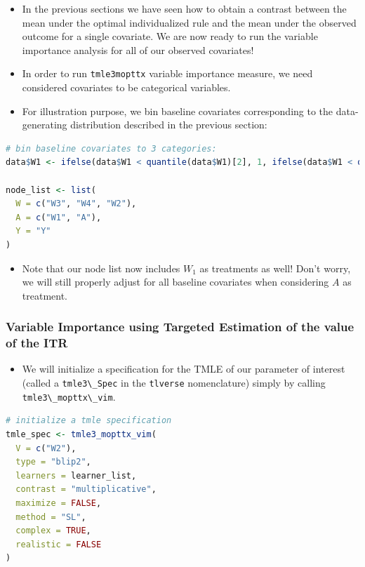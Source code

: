 \documentclass[
  12pt, krantz2,
]{book}
\newcommand{\passthrough}[1]{#1}
\providecommand{\tightlist}{%
  \setlength{\itemsep}{0pt}\setlength{\parskip}{0pt}}
\theoremstyle{definition}
\theoremstyle{definition}
\theoremstyle{definition}
\newcommand{\1}{\mathbbm{1}}
\begin{document}
\begin{itemize}
\item
  In the previous sections we have seen how to obtain a contrast between the
  mean under the optimal individualized rule and the mean under the observed outcome for a
  single covariate. We are now ready to run the variable importance analysis for all of our
  observed covariates!
\item
  In order to run \passthrough{\lstinline!tmle3mopttx!} variable importance measure, we
  need considered covariates to be categorical variables.
\item
  For illustration purpose,
  we bin baseline covariates corresponding to the data-generating distribution
  described in the previous section:
\end{itemize}

\begin{lstlisting}[language=R]
# bin baseline covariates to 3 categories:
data$W1 <- ifelse(data$W1 < quantile(data$W1)[2], 1, ifelse(data$W1 < quantile(data$W1)[3], 2, 3))

node_list <- list(
  W = c("W3", "W4", "W2"),
  A = c("W1", "A"),
  Y = "Y"
)
\end{lstlisting}

\begin{itemize}
\tightlist
\item
  Note that our node list now includes \(W_1\) as treatments as well!
  Don't worry, we will still properly adjust for all baseline covariates when
  considering \(A\) as treatment.
\end{itemize}

\hypertarget{variable-importance-using-targeted-estimation-of-the-value-of-the-itr}{%
\subsubsection{Variable Importance using Targeted Estimation of the value of the ITR}\label{variable-importance-using-targeted-estimation-of-the-value-of-the-itr}}

\begin{itemize}
\tightlist
\item
  We will initialize a specification for the TMLE of our parameter of
  interest (called a \passthrough{\lstinline!tmle3\_Spec!} in the \passthrough{\lstinline!tlverse!} nomenclature) simply by calling
  \passthrough{\lstinline!tmle3\_mopttx\_vim!}.
\end{itemize}

\begin{lstlisting}[language=R]
# initialize a tmle specification
tmle_spec <- tmle3_mopttx_vim(
  V = c("W2"),
  type = "blip2",
  learners = learner_list,
  contrast = "multiplicative",
  maximize = FALSE,
  method = "SL",
  complex = TRUE,
  realistic = FALSE
)
\end{lstlisting}
\end{document}
